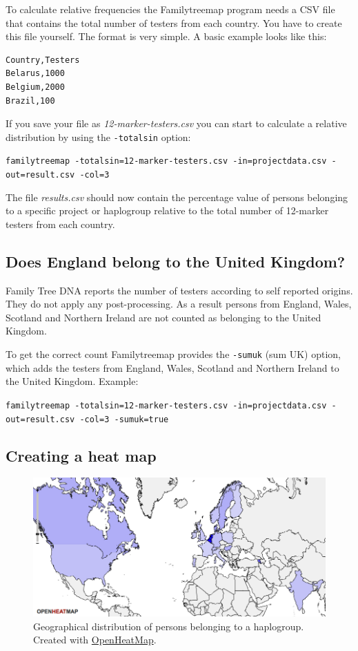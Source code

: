 \documentclass[12pt,a4paper]{article}
\begin{document}
To calculate relative frequencies the Familytreemap program
needs a CSV file that contains the total number of testers
from each country. You have to create this file yourself.
The format is very simple. A basic example looks like this:

\begin{verbatim}
Country,Testers
Belarus,1000
Belgium,2000
Brazil,100
\end{verbatim}

If you save your file as \emph{12-marker-testers.csv}
you can start to calculate a relative distribution by using
the \texttt{-totalsin} option:

\vspace{1ex}
\noindent
\texttt{familytreemap -totalsin=12-marker-testers.csv -in=projectdata.csv -out=result.csv -col=3}
\vspace{1ex}

\noindent
The file \emph{results.csv} should now contain the percentage
value of persons belonging to a specific project or haplogroup
relative to the total number of 12-marker testers from each country.


\subsection{Does England belong to the United Kingdom?}

Family Tree DNA reports the number of testers according to
self reported origins. They do not apply any post-processing.
As a result persons from England, Wales, Scotland and Northern
Ireland are not counted as belonging to the United Kingdom.

To get the correct count Familytreemap provides the 
\texttt{-sumuk} (sum UK) option, which adds the testers from
England, Wales, Scotland and Northern Ireland to the United
Kingdom. Example:

\vspace{1ex}
\noindent
\texttt{familytreemap -totalsin=12-marker-testers.csv -in=projectdata.csv -out=result.csv -col=3 -sumuk=true}


\subsection{Creating a heat map}

\begin{figure}[ht]
\centering
\includegraphics[width=13cm]{heatmap-haplo.png}
\caption{Geographical distribution of persons belonging
to a haplogroup. Created with \href{http://www.openheatmap.com/}{OpenHeatMap}.}
\end{figure}
\end{document}
